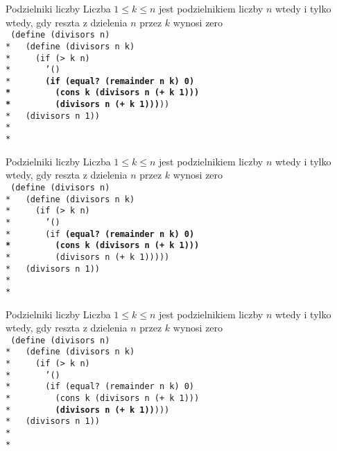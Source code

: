 \begin{frame}{Podzielniki liczby}
  Liczba $1 \le k \le n$ jest podzielnikiem liczby $n$ wtedy i tylko wtedy,
  gdy reszta z dzielenia $n$ przez $k$ wynosi zero\\
  \texttt{
(define (divisors n)\\*
\ \ (define (divisors n k)\\*
\ \ \ \ (if (> k n)\\*
\ \ \ \ \ \ '()\\*
\ \ \ \ \ \ \textbf{(if (equal?\ (remainder n k) 0)\\*
\ \ \ \ \ \ \ \ (cons k (divisors n (+ k 1)))\\*
\ \ \ \ \ \ \ \ (divisors n (+ k 1)))}))\\*
\ \ (divisors n 1))
\ \\*
\ \\*
  }
\end{frame}

\begin{frame}{Podzielniki liczby}
  Liczba $1 \le k \le n$ jest podzielnikiem liczby $n$ wtedy i tylko wtedy,
  gdy reszta z dzielenia $n$ przez $k$ wynosi zero\\
  \texttt{
(define (divisors n)\\*
\ \ (define (divisors n k)\\*
\ \ \ \ (if (> k n)\\*
\ \ \ \ \ \ '()\\*
\ \ \ \ \ \ (if \textbf{(equal?\ (remainder n k) 0)\\*
\ \ \ \ \ \ \ \ (cons k (divisors n (+ k 1)))}\\*
\ \ \ \ \ \ \ \ (divisors n (+ k 1)))))\\*
\ \ (divisors n 1))
\ \\*
\ \\*
  }
\end{frame}

\begin{frame}{Podzielniki liczby}
  Liczba $1 \le k \le n$ jest podzielnikiem liczby $n$ wtedy i tylko wtedy,
  gdy reszta z dzielenia $n$ przez $k$ wynosi zero\\
  \texttt{
(define (divisors n)\\*
\ \ (define (divisors n k)\\*
\ \ \ \ (if (> k n)\\*
\ \ \ \ \ \ '()\\*
\ \ \ \ \ \ (if (equal?\ (remainder n k) 0)\\*
\ \ \ \ \ \ \ \ (cons k (divisors n (+ k 1)))\\*
\ \ \ \ \ \ \ \ \textbf{(divisors n (+ k 1))})))\\*
\ \ (divisors n 1))
\ \\*
\ \\*
  }
\end{frame}

